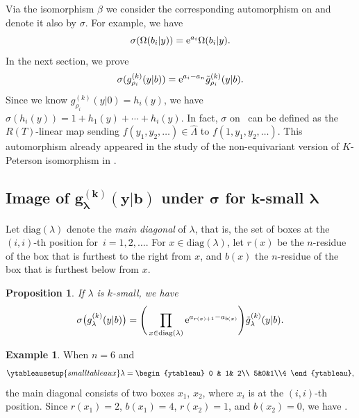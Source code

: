 \documentclass[pdftex]{sigma}
\numberwithin{equation}{section}
\newcommand{\la}{\lambda}
\newcommand{\Rep}{{R(T)}}
\newcommand{\ks}{g}
\newcommand{\kst}{\tilde{g}}
\newtheorem{Proposition}[Theorem]{Proposition}
\theoremstyle{definition}
\newtheorem{Example}[Theorem]{Example}
\begin{document}
Via the isomorphism $\beta$
we consider the corresponding automorphism on \smash{$\hat{\Lambda}_{(n)}^\Rep$}
and denote it also by $\sigma$.
For example,
we have
\begin{equation}
\sigma(\Omega(b_i|y))={\rm e}^{a_i}\Omega(b_i|y)\label{eq:sigma(Omega)}.
\end{equation}
In the next section, we prove
\begin{equation}
\sigma(\ks_{\rho_i}^{(k)}(y|b))={\rm e}^{a_i-a_n}\kst_{\rho_i}^{(k)}(y|b).\label{eq:sigma(tg)}
 \end{equation}
Since we know
$g_{\rho_i}^{(k)}(y|0)=h_i(y)$,
we have
$
\sigma(h_i(y))=1+h_1(y)+\cdots+h_i(y)$.
In fact, $\sigma$
on~\smash{$\hat{\Lambda}^\Rep$} can be defined
as the $\Rep$-linear map
sending $f(y_1,y_2,\dots)\in \hat{\Lambda}$
to $f(1,y_1,\allowbreak y_2,\dots)$.
This automorphism
already appeared in the study of the
non-equivariant version of $K$-Peterson isomorphism in
\cite{BMS,IIN}.

\subsection[Image of g\^{}(k)\_la(y|b) under sigma for k-small la]{Image of $\boldsymbol{{g}^{(k)}_\la(y|b)}$ under $\boldsymbol{\sigma}$ for $\boldsymbol{k}$-small $\boldsymbol{\la}$}

Let $\mathrm{diag}(\lambda)$ denote the \textit{main diagonal} of $\lambda$, that is, the set of boxes at the $(i,i)$-th position for~${i=1,2,\dots}$.
For $x\in \mathrm{diag}(\lambda)$, let $r(x)$ be the $n$-residue of the box that is furthest to the right from $x$, and $b(x)$ the $n$-residue of the box that is furthest below from $x$.
\begin{Proposition}\label{prop:v1_of_kKShur}
If $\lambda$ is $k$-small, we have
\[
\sigma\bigl(g^{(k)}_\lambda(y|b)\bigr)
=
\Bigg(\prod_{x\in \mathrm{diag}(\lambda)}{\rm e}^{a_{r(x)+1}-a_{b(x)}}\Bigg)
\tilde{g}^{(k)}_\lambda(y|b).\]
\end{Proposition}

\begin{Example}
When $n=6$ and
\[
\ytableausetup{smalltableaux}\lambda=
 \begin{ytableau}
 0 & 1& 2\\ 5&0&1\\4
 \end{ytableau}
 ,
 \]
the main diagonal consists of two boxes $x_1$, $x_2$, where $x_i$ is at the $(i,i)$-th position.
Since
$r(x_1)=2$,
$b(x_1)=4$,
$r(x_2)=1$, and
$b(x_2)=0$,
we have .
\end{Example}
\end{document}
